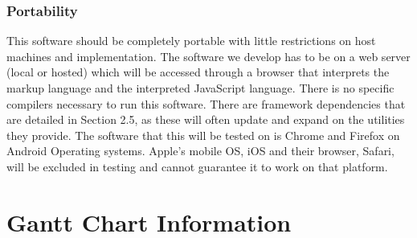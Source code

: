 \documentclass[letterpaper,10pt,titlepage,draftclsnofoot,onecolumn,compsoc,utf8,latin1]{IEEEtran}
\begin{document}
\begin{singlespace}
\subsubsection{Portability}
\begin{singlespace}
\noindent
This software should be completely portable with little restrictions on host machines and implementation. The software we develop has to be on a web server (local or hosted) which will be accessed through a browser that interprets the markup language and the interpreted JavaScript language. There is no specific compilers necessary to run this software. There are framework dependencies that are detailed in Section 2.5, as these will often update and expand on the utilities they provide. The software that this will be tested on is Chrome and Firefox on Android Operating systems. Apple's mobile OS, iOS and their browser, Safari, will be excluded in testing and cannot guarantee it to work on that platform.
\end{singlespace}

\end{singlespace}

\section{Gantt Chart Information}
\end{document}
